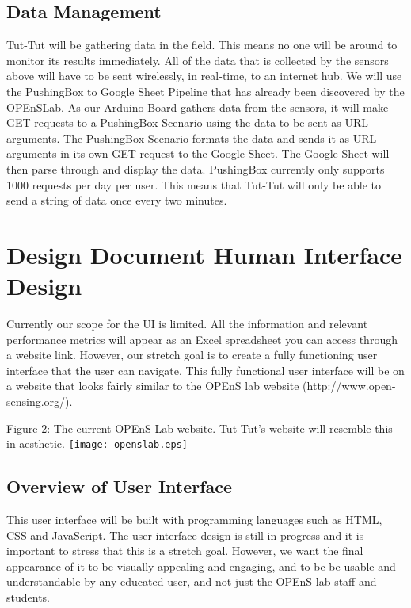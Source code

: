 \documentclass[letterpaper,10pt,draftclsnofoot,onecolumn]{article}
\begin{document}
\subsection{Data Management}
Tut-Tut will be gathering data in the field. This means no one will be around to monitor its results immediately. All of the data that is collected by the sensors above will have to be sent wirelessly, in real-time, to an internet hub. We will use the PushingBox to Google Sheet Pipeline that has already been discovered by the OPEnSLab.\cite{pushingbox} As our Arduino Board gathers data from the sensors, it will make GET requests to a PushingBox Scenario using the data to be sent as URL arguments. The PushingBox Scenario formats the data and sends it as URL arguments in its own GET request to the Google Sheet. The Google Sheet will then parse through and display the data. PushingBox currently only supports 1000 requests per day per user. This means that Tut-Tut will only be able to send a string of data once every two minutes.

\section{Design Document Human Interface Design}
Currently our scope for the UI is limited. All the information and relevant performance metrics will appear as an Excel spreadsheet you can access through a website link. However, our stretch goal is to create a fully functioning user interface that the user can navigate. This fully functional user interface will be on a website that looks fairly similar to the OPEnS lab website (http://www.open-sensing.org/). 
\newline

\begin{center}
Figure 2: The current OPEnS Lab website. Tut-Tut's website will resemble this in aesthetic.\cite{OPEnSLab}
\texttt{[image: openslab.eps]}
\end{center}

\subsection{Overview of User Interface}
This user interface will be built with programming languages such as HTML, CSS and JavaScript. The user interface design is still in progress and it is important to stress that this is a stretch goal. However, we want the final appearance of it to be visually appealing and engaging, and to be be usable and understandable by any educated user, and not just the OPEnS lab staff and students.
\end{document}

